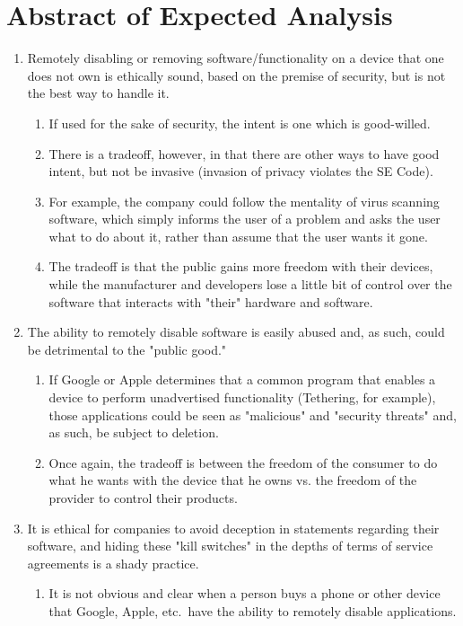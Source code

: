 \documentclass[12pt]{article}
\begin{document}
\section{Abstract of Expected Analysis}
\begin{enumerate}
\item Remotely disabling or removing software/functionality on a device that one does not own is ethically sound, based on the premise of security, but is not the best way to handle it.
\begin{enumerate}
\item If used for the sake of security, the intent is one which is good-willed.
\item There is a tradeoff, however, in that there are other ways to have good intent, but not be invasive (invasion of privacy violates the SE Code). \cite{secode}
\item For example, the company could follow the mentality of virus scanning software, which simply informs the user of a problem and asks the user what to do about it, rather than assume that the user wants it gone.
\item The tradeoff is that the public gains more freedom with their devices, while the manufacturer and developers lose a little bit of control over the software that interacts with "their" hardware and software.
\end{enumerate}
\item The ability to remotely disable software is easily abused and, as such, could be detrimental to the "public good."
\begin{enumerate}
\item If Google or Apple determines that a common program that enables a device to perform unadvertised functionality (Tethering, for example), those applications could be seen as "malicious" and "security threats" and, as such, be subject to deletion.
\item Once again, the tradeoff is between the freedom of the consumer to do what he wants with the device that he owns vs. the freedom of the provider to control their products.
\end{enumerate}
\item It is ethical for companies to avoid deception in statements regarding their software, and hiding these "kill switches" in the depths of terms of service agreements is a shady practice. \cite{secode}
\begin{enumerate}
\item It is not obvious and clear when a person buys a phone or other device that Google, Apple, etc.\ have the ability to remotely disable applications.

\end{enumerate}
\end{enumerate}
\end{document}

